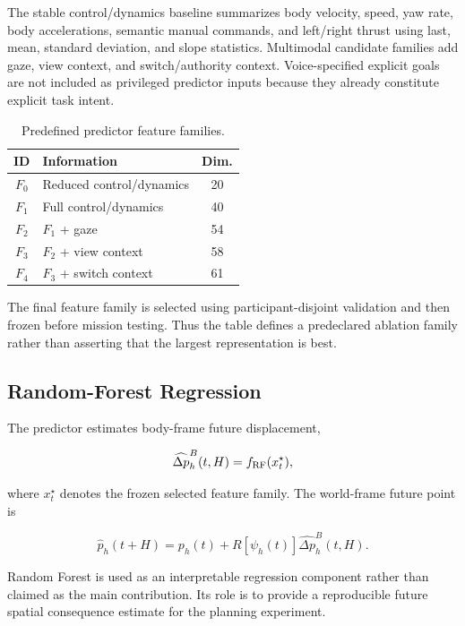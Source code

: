 \documentclass[conference]{IEEEtran}
\begin{document}
The stable control/dynamics baseline summarizes body velocity, speed, yaw rate,
body accelerations, semantic manual commands, and left/right thrust using last,
mean, standard deviation, and slope statistics. Multimodal candidate families
add gaze, view context, and switch/authority context. Voice-specified explicit
goals are not included as privileged predictor inputs because they already
constitute explicit task intent.

\begin{table}[t]
\centering
\caption{Predefined predictor feature families.}
\label{tab:feature_families}
\small
\setlength{\tabcolsep}{4pt}
\begin{tabular}{clc}
\toprule
ID & Information & Dim.\\
\midrule
$F_0$ & Reduced control/dynamics & 20\\
$F_1$ & Full control/dynamics & 40\\
$F_2$ & $F_1$ + gaze & 54\\
$F_3$ & $F_2$ + view context & 58\\
$F_4$ & $F_3$ + switch context & 61\\
\bottomrule
\end{tabular}
\end{table}

The final feature family is selected using participant-disjoint validation and
then frozen before mission testing. Thus the table defines a predeclared
ablation family rather than asserting that the largest representation is best.

\subsection{Random-Forest Regression}

The predictor estimates body-frame future displacement,

\begin{equation}
\widehat{\Delta p}_h^B(t,H)=f_{\rm RF}(x_t^{\star}),
\label{eq:rf_regression}
\end{equation}

where $x_t^{\star}$ denotes the frozen selected feature family. The world-frame
future point is

\begin{equation}
\hat p_h(t+H)=
p_h(t)+R[\psi_h(t)]\widehat{\Delta p}_h^B(t,H).
\label{eq:world_prediction}
\end{equation}

Random Forest is used as an interpretable regression component rather than
claimed as the main contribution. Its role is to provide a reproducible future
spatial consequence estimate for the planning experiment.
\end{document}
